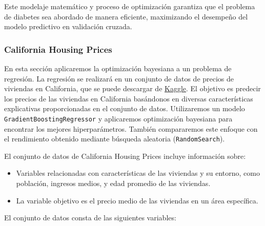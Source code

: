 \documentclass[
  12pt,
  letterpaper,
  DIV=11,
  numbers=noendperiod]{scrartcl}
\begin{document}
Este modelaje matemático y proceso de optimización garantiza que el
problema de diabetes sea abordado de manera eficiente, maximizando el
desempeño del modelo predictivo en validación cruzada.

\subsubsection{California Housing
Prices}\label{california-housing-prices}

En esta sección aplicaremos la optimización bayesiana a un problema de
regresión. La regresión se realizará en un conjunto de datos de precios
de viviendas en California, que se puede descargar de
\href{https://www.kaggle.com/camnugent/california-housing-prices}{Kaggle}.
El objetivo es predecir los precios de las viviendas en California
basándonos en diversas características explicativas proporcionadas en el
conjunto de datos. Utilizaremos un modelo
\texttt{GradientBoostingRegressor} y aplicaremos optimización bayesiana
para encontrar los mejores hiperparámetros. También compararemos este
enfoque con el rendimiento obtenido mediante búsqueda aleatoria
(\texttt{RandomSearch}).

El conjunto de datos de California Housing Prices incluye información
sobre:

\begin{itemize}
\item
  Variables relacionadas con características de las viviendas y su
  entorno, como población, ingresos medios, y edad promedio de las
  viviendas.
\item
  La variable objetivo es el precio medio de las viviendas en un área
  específica.
\end{itemize}

El conjunto de datos consta de las siguientes variables:
\end{document}
